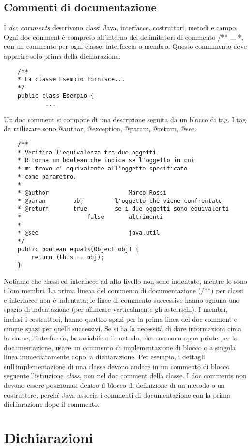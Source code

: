 \subsection{Commenti di documentazione}
I \textit{doc comments} descrivono classi Java, interfacce, costruttori, metodi e campo. Ogni doc comment è compreso all'interno dei delimitatori di commento /** ... *, con un commento per ogni classe, interfaccia o membro. Questo commmento deve apparire solo prima della dichiarazione:		   			
	\begin{lstlisting}
    /**
    * La classe Esempio fornisce...
    */
    public class Esempio {
    	    ...
	\end{lstlisting}
Un doc comment si compone di una descrizione seguita da un blocco di tag. I tag da utilizzare sono @author, @exception, @param, @return, @see.
\clearpage
	\begin{lstlisting}
	/**
	* Verifica l'equivalenza tra due oggetti.
	* Ritorna un boolean che indica se l'oggetto in cui 
	* mi trovo e' equivalente all'oggetto specificato 
	* come parametro.
	* 
	* @author						Marco Rossi
	* @param		obj			l'oggetto che viene confrontato
	* @return		true		se i due oggetti sono equivalenti
	* 					false		altrimenti
	*
	* @see							java.util
	*/
	public boolean equals(Object obj) {
		return (this == obj);
	}				
	\end{lstlisting}
Notiamo che classi ed interfacce ad alto livello non sono indentate, mentre lo sono i loro membri. La prima lineaa del commento di documentazione (/**) per classi e interfacce non è indentata; le linee di commento successive hanno ognuna uno spazio di indentazione (per allineare verticalmente gli asterischi). I membri, inclusi i costruttori, hanno quattro spazi per la prima linea del doc comment e cinque spazi per quelli successivi. Se si ha la necessità di dare informazioni circa la classe, l'interfaccia, la variabile o il metodo, che non sono appropriate per la documentazione, usare un commento di implementazione di blocco o a singola linea immediatamente dopo la dichiarazione. Per esempio, i dettagli sull'implementazione di una classe devono andare in un commento di blocco seguente l'istruzione \textit{class}, non nel doc comment della classe. I doc comments non devono essere posizionati dentro il blocco di definizione di un metodo o un costruttore, perché Java associa i commenti di documentazione con la prima dichiarazione dopo il commento.
\clearpage
%
%
\section{Dichiarazioni}
